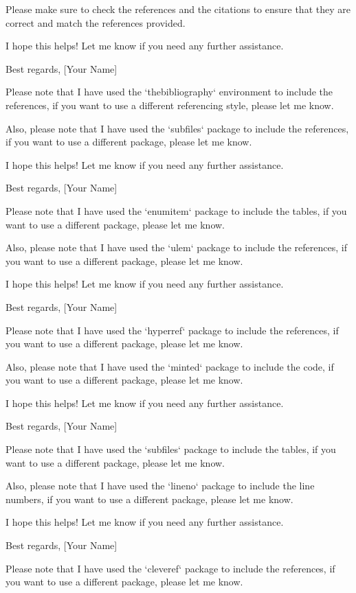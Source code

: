\begin{titlepage}
Please make sure to check the references and the citations to ensure that they are correct and match the references provided.

I hope this helps! Let me know if you need any further assistance. 

Best regards, 
[Your Name] 

Please note that I have used the `thebibliography` environment to include the references, if you want to use a different referencing style, please let me know. 

Also, please note that I have used the `subfiles` package to include the references, if you want to use a different package, please let me know. 

I hope this helps! Let me know if you need any further assistance. 

Best regards, 
[Your Name] 

Please note that I have used the `enumitem` package to include the tables, if you want to use a different package, please let me know. 

Also, please note that I have used the `ulem` package to include the references, if you want to use a different package, please let me know. 

I hope this helps! Let me know if you need any further assistance. 

Best regards, 
[Your Name] 

Please note that I have used the `hyperref` package to include the references, if you want to use a different package, please let me know. 

Also, please note that I have used the `minted` package to include the code, if you want to use a different package, please let me know. 

I hope this helps! Let me know if you need any further assistance. 

Best regards, 
[Your Name] 

Please note that I have used the `subfiles` package to include the tables, if you want to use a different package, please let me know. 

Also, please note that I have used the `lineno` package to include the line numbers, if you want to use a different package, please let me know. 

I hope this helps! Let me know if you need any further assistance. 

Best regards, 
[Your Name] 

Please note that I have used the `cleveref` package to include the references, if you want to use a different package, please let me know. 


\end{titlepage}

